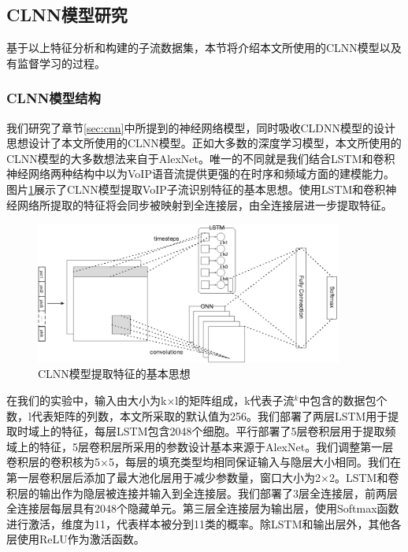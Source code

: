 \subsection{CLNN模型研究}
基于以上特征分析和构建的子流数据集，本节将介绍本文所使用的CLNN模型以及有监督学习的过程。
\subsubsection{CLNN模型结构}

我们研究了章节\ref{sec:cnn}中所提到的神经网络模型，同时吸收CLDNN模型\supercite{clnn}的设计思想设计了本文所使用的CLNN模型。正如大多数的深度学习模型，本文所使用的CLNN模型的大多数想法来自于AlexNet。唯一的不同就是我们结合LSTM和卷积神经网络两种结构中以为VoIP语音流提供更强的在时序和频域方面的建模能力。图片\ref{fig:cnnlstm}展示了CLNN模型提取VoIP子流识别特征的基本思想。使用LSTM和卷积神经网络所提取的特征将会同步被映射到全连接层，由全连接层进一步提取特征。
\begin{figure}[thb]
\begin{center}
\includegraphics[width=0.9\textwidth]{figures/cnnlstm.eps}
\caption{CLNN模型提取特征的基本思想}\label{fig:cnnlstm}
\end{center}
\end{figure}

在我们的实验中，输入由大小为k$\times$l的矩阵组成，k代表子流$^k$中包含的数据包个数，l代表矩阵的列数，本文所采取的默认值为256。我们部署了两层LSTM用于提取时域上的特征，每层LSTM包含2048个细胞。平行部署了5层卷积层用于提取频域上的特征，5层卷积层所采用的参数设计基本来源于AlexNet。我们调整第一层卷积层的卷积核为5$\times$5，每层的填充类型均相同保证输入与隐层大小相同。我们在第一层卷积层后添加了最大池化层用于减少参数量，窗口大小为2$\times$2。LSTM和卷积层的输出作为隐层被连接并输入到全连接层。我们部署了3层全连接层，前两层全连接层每层具有2048个隐藏单元。第三层全连接层为输出层，使用Softmax函数进行激活，维度为11，代表样本被分到11类的概率。除LSTM和输出层外，其他各层使用ReLU作为激活函数。


